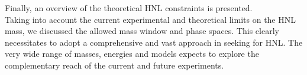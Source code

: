 Finally, an overview of the theoretical HNL
constraints is presented.\\
Taking into account 
the current experimental and theoretical limits on the HNL
mass, we discussed the allowed mass window and phase spaces. This clearly necessitates to adopt a
comprehensive and vast approach in seeking for HNL.
The very wide range of masses, energies and models expects to
explore the complementary reach of the current and future experiments.\\














